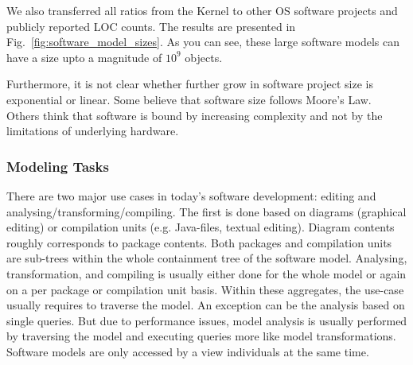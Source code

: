 We also transferred all ratios from the Kernel to other OS software projects and publicly reported LOC counts. The results are presented in Fig.~\ref{fig:software_model_sizes}. As you can see, these large software models can have a size upto a magnitude of $10^9$ objects.

Furthermore, it is not clear whether further grow in software project size is exponential or linear. 
Some believe that software size follows Moore's Law. Others think that software is bound by increasing complexity and not by the limitations of underlying hardware.

\subsubsection*{Modeling Tasks}
There are two major use cases in today's software development: editing and analysing/transforming/compiling. The first is done based on diagrams (graphical editing) or compilation units (e.g. Java-files, textual editing). Diagram contents roughly corresponds to package contents. Both packages and compilation units are sub-trees within the whole containment tree of the software model. Analysing, transformation, and compiling is usually either done for the whole model or again on a per package or compilation unit basis. Within these aggregates, the use-case usually requires to traverse the model. An exception can be the analysis based on single queries. But due to performance issues, model analysis is usually performed by traversing the model and executing queries more like model transformations. Software models are only accessed by a view individuals at the same time.

